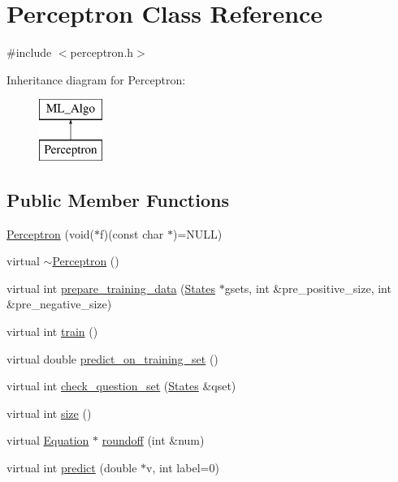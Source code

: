 \hypertarget{classPerceptron}{}\section{Perceptron Class Reference}
\label{classPerceptron}


{\ttfamily \#include $<$perceptron.\+h$>$}

Inheritance diagram for Perceptron\+:\begin{figure}[H]
\begin{center}
\leavevmode
\includegraphics[height=2.000000cm]{classPerceptron}
\end{center}
\end{figure}
\subsection*{Public Member Functions}
\begin{DoxyCompactItemize}
\item 
\hyperlink{classPerceptron_aa2364f629d771f5e9bf4fc9f70a17cbc}{Perceptron} (void($\ast$f)(const char $\ast$)=N\+U\+LL)
\item 
virtual \hyperlink{classPerceptron_a0267e40e981df9907129d858911840e7}{$\sim$\+Perceptron} ()
\item 
virtual int \hyperlink{classPerceptron_a2267c5acf9b4a7bd0f47522a530d3863}{prepare\+\_\+training\+\_\+data} (\hyperlink{classStates}{States} $\ast$gsets, int \&pre\+\_\+positive\+\_\+size, int \&pre\+\_\+negative\+\_\+size)
\item 
virtual int \hyperlink{classPerceptron_adc779991ee63dca333c12fb247b32c9d}{train} ()
\item 
virtual double \hyperlink{classPerceptron_ac9214d2cda4eeb9a06f6562bcb5df8ca}{predict\+\_\+on\+\_\+training\+\_\+set} ()
\item 
virtual int \hyperlink{classPerceptron_ac7ed76c6a28180691f63f2afbf93cc26}{check\+\_\+question\+\_\+set} (\hyperlink{classStates}{States} \&qset)
\item 
virtual int \hyperlink{classPerceptron_a50b1f76eb2760b540477135100dcbf49}{size} ()
\item 
virtual \hyperlink{classEquation}{Equation} $\ast$ \hyperlink{classPerceptron_a5408f0ea545d06bbef6630071c73fea2}{roundoff} (int \&num)
\item 
virtual int \hyperlink{classPerceptron_a414600a1f189c4f44c858b87048ae655}{predict} (double $\ast$v, int label=0)
\end{DoxyCompactItemize}
